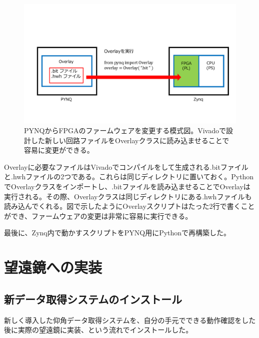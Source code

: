 \begin{figure}[htbp]
  \centering
  \includegraphics[width=1.0\columnwidth]{4_elDAQ/figs/overlay3.pdf}
  \caption{PYNQからFPGAのファームウェアを変更する模式図。Vivadoで設計した新しい回路ファイルをOverlayクラスに読み込ませることで容易に変更ができる。}
  \label{overlay}
\end{figure}

Overlayに必要なファイルはVivadoでコンパイルをして生成される.bitファイルと.hwhファイルの2つである。これらは同じディレクトリに置いておく。PythonでOverlayクラスをインポートし、.bitファイルを読み込ませることでOverlayは実行される。その際、Overlayクラスは同じディレクトリにある.hwhファイルも読み込んでくれる。図で示したようにOverlayスクリプトはたった2行で書くことができ、ファームウェアの変更は非常に容易に実行できる。

最後に、Zynq内で動かすスクリプトをPYNQ用にPythonで再構築した。

\section{望遠鏡への実装}

\subsection{新データ取得システムのインストール}
新しく導入した仰角データ取得システムを、自分の手元でできる動作確認をした後に実際の望遠鏡に実装、という流れでインストールした。

